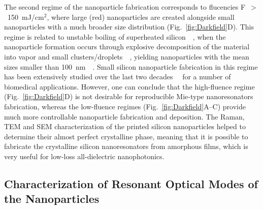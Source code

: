                The second regime of the nanoparticle fabrication corresponds to flucencies F~$>$~150~mJ/cm$^{2}$, where large (red) nanoparticles
            are created alongside small nanoparticles with a much broader size distribution (Fig.~\ref{fig:Darkfield}D). This regime is related to
            unstable boiling of superheated silicon~~\cite{bulgakova2001pulsed, ionin2013thermal, wu2014microscopic}, when the
            nanoparticle formation occurs through explosive decomposition of the material into vapor and small
            clusters/droplets~~\cite{itina2009molecular,wu2014microscopic}, yielding nanoparticles with the mean sizes smaller than
            100~nm~~\cite{amoruso2004generation}. Small silicon nanoparticle fabrication in this regime has been extensively studied
            over the last two decades~~\cite{amoruso2004generation, tull2006formation} for a number of biomedical applications.
            However, one can conclude that the high-fluence regime (Fig.~\ref{fig:Darkfield}D) is not desirable for reproducible Mie-type
            nanoresonators fabrication, whereas the low-fluence regimes (Fig.~\ref{fig:Darkfield}A--C) provide much more controllable
            nanoparticle fabrication and deposition. The Raman, TEM and SEM characterization of the printed silicon nanoparticles
            helped to determine their almost perfect crystalline phase, meaning that it is possible to fabricate the crystalline
            silicon nanoresonators from amorphous films, which is very useful for low-loss all-dielectric nanophotonics.

    \subsection{Characterization of Resonant Optical Modes of the Nanoparticles}
        \label{sec:DarkfieldExp}

